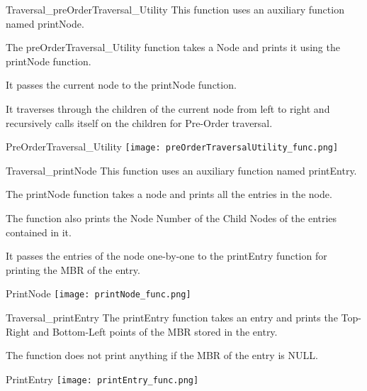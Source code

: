 \documentclass{beamer}
\begin{document}
\begin{frame}{Traversal_{preOrderTraversal\_Utility}}
    This function uses an auxiliary function named printNode.
    
    The preOrderTraversal\_Utility function takes a Node and prints it using the printNode function.
    
    It passes the current node to the printNode function.
    
    It traverses through the children of the current node from left to right and recursively calls itself on the children for Pre-Order traversal.
    
    \begin{block}{PreOrderTraversal\_Utility}
        \texttt{[image: preOrderTraversalUtility\_func.png]}
    \end{block}
\end{frame}
\begin{frame}{Traversal_{printNode}}
    This function uses an auxiliary function named printEntry.
    
    The printNode function takes a node and prints all the entries in the node.
    
    The function also prints the Node Number of the Child Nodes of the entries contained in it.
    
    It passes the entries of the node one-by-one to the printEntry function for printing the MBR of the entry.
    
    \begin{block}{PrintNode}
        \texttt{[image: printNode\_func.png]}
    \end{block}
\end{frame}
\begin{frame}{Traversal_{printEntry}}
    The printEntry function takes an entry and prints the Top-Right and Bottom-Left points of the MBR stored in the entry.
    
    The function does not print anything if the MBR of the entry is NULL.
    
    \begin{block}{PrintEntry}
        \texttt{[image: printEntry\_func.png]}
    \end{block}
\end{frame}
\end{document}
